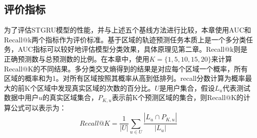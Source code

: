 \documentclass[master]{thesis-uestc}
\begin{document}
\subsection{评价指标}
为了评估STGRU模型的性能，并与上述五个基线方法进行比较，本章使用AUC和Recall@k两个指标作为评价标准。基于区域的轨迹预测任务本质上是一个多分类任务，AUC指标可以较好地评估模型分类效果，具体原理见第二章。Recall@k则是正确预测数与总预测数的比例。在本章中，使用$K=\{1,5,10,15,20\}$来计算Recall@K的不同结果。多分类交叉熵得到的结果是对应每个区域一个概率，所有区域的概率和为1。对所有区域按照其概率从高到低排列。recall分数计算为概率最大的前K个区域中发现真实区域的次数的百分比。$U$是用户集合，假设$L_u$代表测试数据中用户$u$的真实区域集合，$P_{K,u}$表示前K个预测区域的集合，则Recall@K的计算公式可以表示为：
\begin{equation}
Recall@K = \frac{1}{|U|} \sum_{u\in U}\frac{|L_u\cap P_{K,u}|}{|L_u|}
\end{equation}
\end{document}
